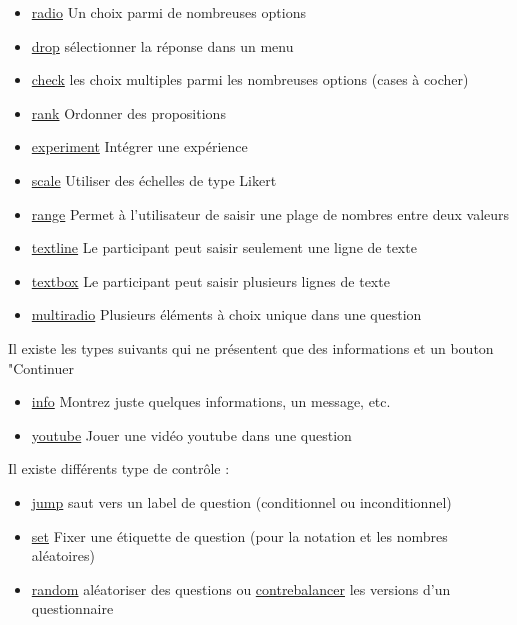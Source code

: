 \documentclass[
]{book}
\providecommand{\tightlist}{%
  \setlength{\itemsep}{0pt}\setlength{\parskip}{0pt}}
\begin{document}
\begin{itemize}
\tightlist
\item
  \protect\hyperlink{survey_radio}{radio} Un choix parmi de nombreuses options
\item
  \protect\hyperlink{survey_drop}{drop} sélectionner la réponse dans un menu
\item
  \protect\hyperlink{survey_check}{check} les choix multiples parmi les nombreuses options (cases à cocher)
\item
  \protect\hyperlink{survey_rank}{rank} Ordonner des propositions
\item
  \protect\hyperlink{survey_experiment}{experiment} Intégrer une expérience
\item
  \protect\hyperlink{survey_scale}{scale} Utiliser des échelles de type Likert
\item
  \protect\hyperlink{survey_range}{range} Permet à l'utilisateur de saisir une plage de nombres entre deux valeurs
\item
  \protect\hyperlink{survey_textline}{textline} Le participant peut saisir seulement une ligne de texte
\item
  \protect\hyperlink{surveytextbox}{textbox} Le participant peut saisir plusieurs lignes de texte
\item
  \protect\hyperlink{survey_multiradio}{multiradio} Plusieurs éléments à choix unique dans une question
\end{itemize}

Il existe les types suivants qui ne présentent que des informations et un bouton "Continuer

\begin{itemize}
\tightlist
\item
  \protect\hyperlink{info}{info} Montrez juste quelques informations, un message, etc.
\item
  \protect\hyperlink{survey_youtube}{youtube} Jouer une vidéo youtube dans une question
\end{itemize}

Il existe différents type de contrôle :

\begin{itemize}
\tightlist
\item
  \protect\hyperlink{survey_jump}{jump} saut vers un label de question (conditionnel ou inconditionnel)
\item
  \protect\hyperlink{survey_scoring}{set} Fixer une étiquette de question (pour la notation et les nombres aléatoires)
\item
  \protect\hyperlink{survey_randomization}{random} aléatoriser des questions ou \protect\hyperlink{survey_randomjump}{contrebalancer} les versions d'un questionnaire
\end{itemize}
\end{document}
